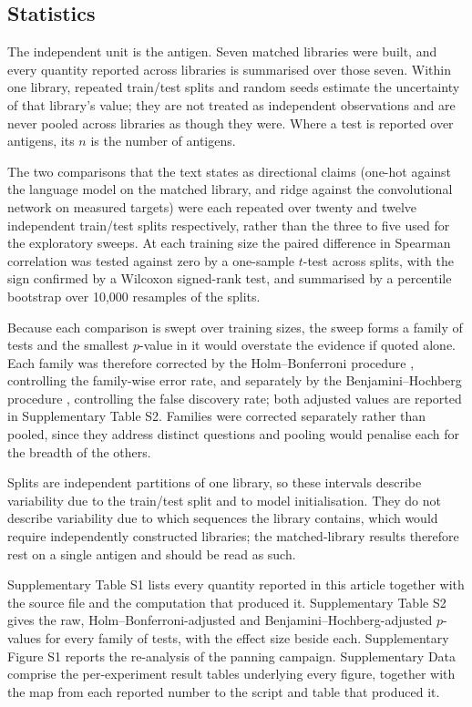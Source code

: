 \documentclass[pdflatex,sn-nature]{sn-jnl}
\theoremstyle{thmstyleone}
\theoremstyle{thmstyletwo}
\theoremstyle{thmstylethree}
\begin{document}
\subsection*{Statistics}

The independent unit is the antigen. Seven matched libraries were built,
and every quantity reported across libraries is summarised over those seven.
Within one library, repeated train/test splits and random seeds estimate the
uncertainty of that library's value; they are not treated as independent
observations and are never pooled across libraries as though they were. Where
a test is reported over antigens, its $n$ is the number of antigens.

The two comparisons that the text states as directional claims (one-hot
against the language model on the matched library, and ridge against the
convolutional network on measured targets) were each repeated over twenty and
twelve independent train/test splits respectively, rather than the three to
five used for the exploratory sweeps. At each training size the paired
difference in Spearman correlation was tested against zero by a one-sample
$t$-test across splits, with the sign confirmed by a Wilcoxon signed-rank test,
and summarised by a percentile bootstrap over 10{,}000 resamples of the splits.

Because each comparison is swept over training sizes, the sweep forms a family
of tests and the smallest $p$-value in it would overstate the evidence if
quoted alone. Each family was therefore corrected by the Holm--Bonferroni
procedure \cite{holm1979}, controlling the family-wise error rate, and separately
by the Benjamini--Hochberg procedure \cite{benjamini1995}, controlling the false
discovery rate; both
adjusted values are reported in Supplementary Table S2. Families were corrected
separately rather than pooled, since they address distinct questions and
pooling would penalise each for the breadth of the others.

Splits are independent partitions of one library, so these intervals describe
variability due to the train/test split and to model initialisation. They do
not describe variability due to which sequences the library contains, which
would require independently constructed libraries; the matched-library results
therefore rest on a single antigen and should be read as such.

\backmatter


Supplementary Table S1 lists every quantity reported in this article together
with the source file and the computation that produced it. Supplementary
Table S2 gives the raw, Holm--Bonferroni-adjusted and
Benjamini--Hochberg-adjusted $p$-values for every family of tests, with the
effect size beside each. Supplementary Figure S1 reports the
re-analysis of the panning campaign. Supplementary Data comprise the per-experiment result tables underlying
every figure, together with the map from each reported number to the script
and table that produced it.
\end{document}
